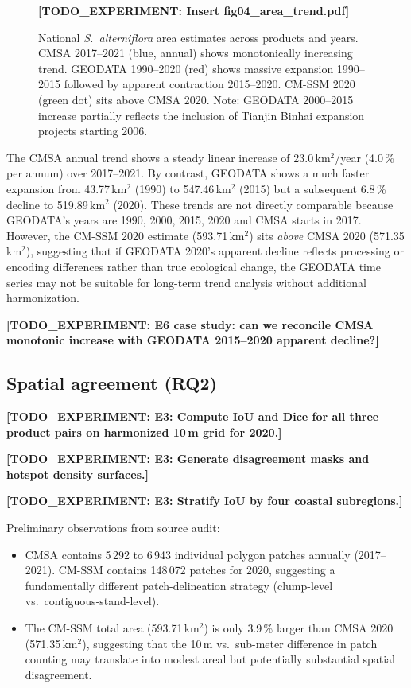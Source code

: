 \documentclass[11pt]{article}
\newcommand{\TODOEXP}[1]{\textcolor{todocolor}{\textbf{[TODO_EXPERIMENT: #1]}}}
\begin{document}
\begin{figure}[htpb]
\centering
\TODOEXP{Insert fig04\_area\_trend.pdf}
\caption{\label{fig:area_trend}National \textit{S.~alterniflora} area estimates
  across products and years. CMSA 2017--2021 (blue, annual) shows monotonically
  increasing trend. GEODATA 1990--2020 (red) shows massive expansion 1990--2015
  followed by apparent contraction 2015--2020. CM-SSM 2020 (green dot) sits
  above CMSA 2020. Note: GEODATA 2000--2015 increase partially reflects the
  inclusion of Tianjin Binhai expansion projects starting 2006.}
\end{figure}

The CMSA annual trend shows a steady linear increase of 23.0\,km$^2$/year
(4.0\,\% per annum) over 2017--2021. By contrast, GEODATA shows a much faster
expansion from 43.77\,km$^2$ (1990) to 547.46\,km$^2$ (2015) but a subsequent
6.8\,\% decline to 519.89\,km$^2$ (2020). These trends are not directly
comparable because GEODATA's years are 1990, 2000, 2015, 2020 and CMSA starts in
2017. However, the CM-SSM 2020 estimate (593.71\,km$^2$) sits \emph{above}
CMSA 2020 (571.35\,km$^2$), suggesting that if GEODATA 2020's apparent decline
reflects processing or encoding differences rather than true ecological change,
the GEODATA time series may not be suitable for long-term trend analysis without
additional harmonization.

\TODOEXP{E6 case study: can we reconcile CMSA monotonic increase with GEODATA
2015--2020 apparent decline?}

\subsection{Spatial agreement (RQ2)}

\TODOEXP{E3: Compute IoU and Dice for all three product pairs on harmonized
10\,m grid for 2020.}

\TODOEXP{E3: Generate disagreement masks and hotspot density surfaces.}

\TODOEXP{E3: Stratify IoU by four coastal subregions.}

Preliminary observations from source audit:
\begin{itemize}[nosep]
\item CMSA contains 5\,292 to 6\,943 individual polygon patches annually
  (2017--2021). CM-SSM contains 148\,072 patches for 2020, suggesting a
  fundamentally different patch-delineation strategy (clump-level vs.\
  contiguous-stand-level).
\item The CM-SSM total area (593.71\,km$^2$) is only 3.9\,\% larger than CMSA
  2020 (571.35\,km$^2$), suggesting that the 10\,m vs.\ sub-meter difference
  in patch counting may translate into modest areal but potentially
  substantial spatial disagreement.
\end{itemize}
\end{document}
